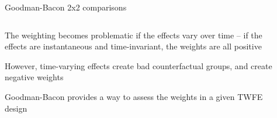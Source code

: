 \documentclass[notes,11pt, aspectratio=169]{beamer}
\newenvironment{wideitemize}{\itemize\addtolength{\itemsep}{10pt}}{\enditemize}
\begin{document}
\begin{frame}{Goodman-Bacon 2x2 comparisons}
  \begin{columns}[T] %
    \begin{column}{0.4\textwidth}
      \begin{wideitemize}
      \item<1-> The weighting becomes problematic if the effects vary
        over time -- if the effects are instantaneous and
        time-invariant, the weights are all positive
      \item<2-> However, time-varying effects create bad
        counterfactual groups, and create negative weights
      \item<2-> Goodman-Bacon provides a way to assess the weights in
        a given TWFE design
      \end{wideitemize}
    \end{column}%
    \hfill%
    \begin{column}{.6\textwidth}
    \end{column}%
  \end{columns}
\end{frame}
\end{document}

